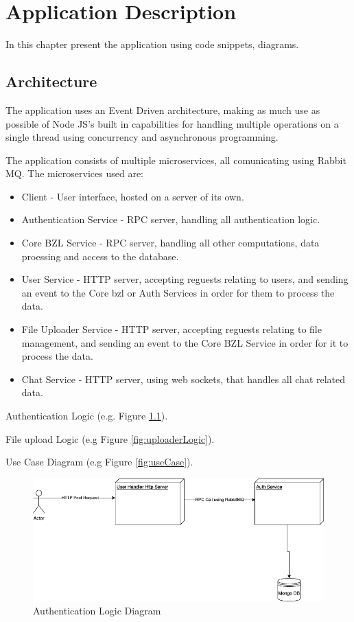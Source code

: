 
\chapter{Application Description}

In this chapter present the application using code snippets, diagrams.

\section{Architecture}

The application uses an Event Driven architecture, making as much use as possible of Node JS's built in capabilities for handling multiple operations on a single thread using concurrency and asynchronous programming.

The application consists of multiple microservices, all comunicating using Rabbit MQ. The microservices used are:
\begin{itemize}
    \item Client - User interface, hosted on a server of its own.
    \item Authentication Service - RPC server, handling all authentication logic.
    \item Core BZL Service - RPC server, handling all other computations, data proessing and access to the database.
    \item User Service - HTTP server, accepting reguests relating to users, and sending an event to the Core bzl or Auth Services in order for them to process the data.
    \item File Uploader Service - HTTP server, accepting reguests relating to file management, and sending an event to the Core BZL Service in order for it to process the data.
    \item Chat Service - HTTP server, using web sockets, that handles all chat related data.
\end{itemize}

Authentication Logic (e.g. Figure \ref{fig:authLogic}).

File upload Logic (e.g Figure \ref{fig:uploaderLogic}).

Use Case Diagram (e.g Figure \ref{fig:useCase}).
\begin{figure}[!ht]
    \centering
    \includegraphics[width=1\linewidth]{Ples Serban Thesis/login.drawio.png}
    \caption{Authentication Logic Diagram}
    \label{fig:authLogic}
\end{figure}

